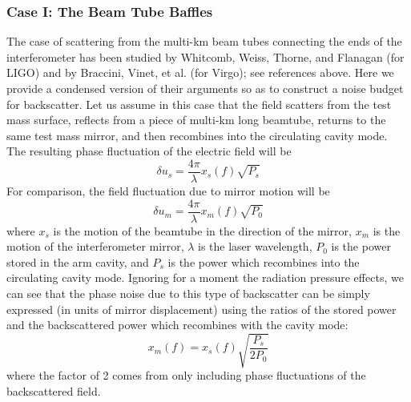 \subsubsection{Case I: The Beam Tube Baffles}
The case of scattering from the multi-km beam tubes connecting the ends of the
interferometer has been studied by Whitcomb, Weiss, Thorne, and Flanagan (for LIGO)
and by Braccini, Vinet, et al. (for Virgo); see references above. Here we provide
a condensed version of their arguments so as to construct a noise budget for backscatter.
Let us assume in this case that the field scatters from the test mass surface,
reflects from a piece of multi-km long beamtube, returns to the same test mass
mirror, and then recombines into the circulating cavity mode. The resulting
phase fluctuation of the electric field will be
\begin{equation}
\delta u_{s} = \frac{4 \pi}{\lambda} x_{s}(f) \sqrt{P_s}
\end{equation}
For comparison, the field fluctuation due to mirror motion will be
\begin{equation}
\delta u_{m} = \frac{4 \pi}{\lambda} x_{m}(f) \sqrt{P_0}
\end{equation}
where $x_s$ is the motion of the beamtube in the direction of the mirror, $x_m$
is the motion of the interferometer mirror, $\lambda$ is the laser wavelength,
$P_0$ is the power stored in the arm cavity, and $P_s$ is the power which
recombines into the circulating cavity mode. Ignoring for a moment the radiation
pressure effects, we can see that the phase noise due to this type of backscatter
can be simply expressed (in units of mirror displacement) using the ratios of
the stored power and the backscattered power which recombines with the cavity mode:
\begin{equation}
x_{m}(f) = x_{s}(f) \sqrt{\frac{P_s}{2 P_0}}
\end{equation}
where the factor of 2 comes from only including phase fluctuations of the backscattered field.

